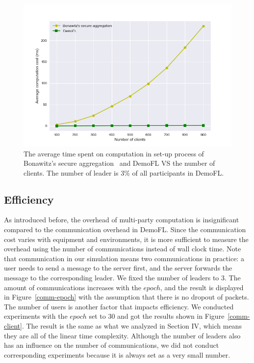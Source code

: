\begin{figure}[!ht]
    \centering
    \includegraphics[width=\columnwidth]{img/avg-user-cpu.png}
    \caption{The average time spent on computation in set-up process of Bonawitz's secure aggregation~\cite{Practical} and DemoFL VS the number of clients. The number of leader is 3\% of all participants in DemoFL.}
    \label{avg-user-cpu}
\end{figure}

\subsection{Efficiency}
As introduced before, the overhead of multi-party computation is insignificant compared to the communication overhead in DemoFL. Since the communication cost varies with equipment and environments, it is more sufficient to measure the overhead using the number of communications instead of wall clock time. Note that communication in our simulation means two communications in practice: a user needs to send a message to the server first, and the server forwards the message to the corresponding leader. We fixed the number of leaders to 3. The amount of communications increases with the $epoch$, and the result is displayed in Figure~\ref{comm-epoch} with the assumption that there is no dropout of packets. The number of users is another factor that impacts efficiency. We conducted experiments with the $epoch$ set to 30 and got the results shown in Figure~\ref{comm-client}. The result is the same as what we analyzed in Section IV, which means they are all of the linear time complexity. Although the number of leaders also has an influence on the number of communications, we did not conduct corresponding experiments because it is always set as a very small number. 


